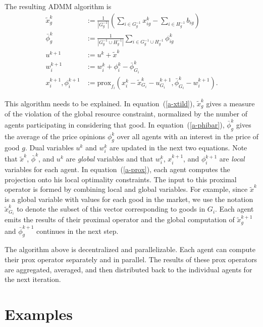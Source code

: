 \documentclass[12pt]{article}
\begin{document}
The resulting ADMM algorithm is 
\begin{align}
\label{a-xtild}
\tilde{x}^k_g &:= \frac{1}{|G^{-1}_g|} \left( \sum_{i \in G^{-1}_g} x^k_{ig} - \sum_{i \in H^{-1}_g} b_{ig}\right)\\
\label{a-phibar}
\bar{\phi}^k_g &:= \frac{1}{ |G^{-1}_g \cup H^{-1}_g| } \sum_{i \in G^{-1}_g \cup H^{-1}_g}\phi^k_{ig}\\
u^{k+1} &:= u^k + \tilde{x}^k\\
w_i^{k+1} &:= w_i^k + \phi^k_i - \bar{\phi}^k_{G_i}\\
\label{a-prox}
x_i^{k+1}, \phi_i^{k+1} &:= \mbox{prox}_{f_i}(x_i^k - \tilde{x}^k_{G_i} - u^{k+1}_{G_i},
\bar{\phi}^k_{G_i} - w_i^{k+1}).
\end{align}

This algorithm needs to be explained.
In equation~(\ref{a-xtild}), $\tilde{x}^k_g$ gives a measure of the violation of
the global resource constraint, normalized by the number of agents participating
in considering that good.
In equation~(\ref{a-phibar}), $\bar{\phi}^k_g$ gives the average of the price
opinions $\phi^k_g$ over all agents with an interest in the price of good $g$.
Dual variables $u^k$ and $w^k_i$ are updated in the next two equations.
Note that $\tilde{x}^k$, $\bar{\phi}^k$, and $u^k$ are \emph{global} variables
and that $w_i^k$, $x_i^{k+1}$, and $\phi_i^{k+1}$ are \emph{local} variables
for each agent. In equation~(\ref{a-prox}), each agent computes the projection
onto his local optimality constraints.
The input to this proximal operator is formed by combining
local and global variables.
For example, since $\tilde{x}^k$ is a global variable with values for each good in the market, we use the notation $\tilde{x}^k_{G_i}$ to denote the subset of this vector corresponding to goods in $G_i$.
Each agent emits the results of their proximal operator and the
global computation of $\tilde{x}^{k+1}_g$ and $\bar{\phi}^{k+1}_g$ continues in the next step.

The algorithm above is decentralized and parallelizable.
Each agent can compute their prox operator separately and in parallel.
The results of these prox operators are aggregated, averaged, and then distributed
back to the individual agents for the next iteration.





\section{Examples}
\end{document}
